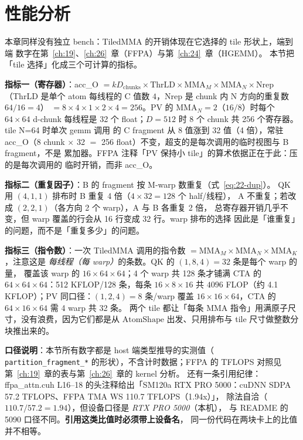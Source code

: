 \section{性能分析}

本章同样没有独立 bench：TiledMMA 的开销体现在它选择的 tile 形状上，端到端
数字在第~\ref{ch:19}、\ref{ch:26}~章（FFPA）与第~\ref{ch:24}~章（HGEMM）。
本节把「tile 选择」化成三个可计算的指标。

\textbf{指标一（寄存器）}：acc\_O $=kD_{\mathrm{chunks}}\times\mathrm{ThrLD}
\times\mathrm{MMA}_M\times\mathrm{MMA}_N\times\mathrm{Nrep}$（ThrLD 是单个
atom 每线程的 C 值数 $4$，Nrep 是 chunk 内 N 方向的重复数 $64/16=4$）
$=8\times4\times1\times2\times4=256$。PV 的
$\mathrm{MMA}_N = 2$（$16/8$）时每个 $64\times64$ d-chunk 每线程是 32 个
float；$D=512$ 时 $8$ 个 chunk 共 256 个寄存器。tile N=64 时单次 gemm 调用
的 C fragment 从 8 值涨到 32 值（4 倍），常驻 acc\_O（8 chunk $\times$ 32
$=$ 256 float）不变，超支的是每次调用的临时视图与 B fragment，不是
累加器。FFPA 注释「PV 保持小 tile」的算术依据正在于此：压的是每次调用的
临时开销，而非 acc\_O。

\textbf{指标二（重复因子）}：B 的 fragment 按 M-warp 数重复（式~\eqref{eq:22-dup}）。
QK 用 $(4,1,1)$ 排布时 B 重复 4 倍（$4\times32=128$ 个 half/线程），
A 不重复；若改成 $(2,2,1)$（各方向 2 个 warp），A 与 B 各重复 2 倍，
总寄存器开销几乎不变，但 warp 覆盖的行会从 16 行变成 32 行。warp 排布的选择
因此是「谁重复」的问题，而不是「重复多少」的问题。

\textbf{指标三（指令数）}：一次 TiledMMA 调用的指令数
$=\mathrm{MMA}_M\times\mathrm{MMA}_N\times\mathrm{MMA}_K$，注意这是
\emph{每线程（每 warp）}的条数。QK 的 $(1,8,4)=32$ 条是每个 warp 的量，
覆盖该 warp 的 $16\times64\times64$；4 个 warp 共 128 条才铺满 CTA 的
$64\times64\times64$：512 KFLOP/128 条，每条 $16\times8\times16$ 共
$4096$ FLOP（约 4.1 KFLOP）；PV 同口径：$(1,2,4)=8$ 条/warp 覆盖
$16\times16\times64$，CTA 的 $64\times16\times64$ 需 4 warp 共 32 条。
两个 tile 都让「每条 MMA 指令」用满原子尺寸，没有浪费，因为它们都是从
$\mathrm{AtomShape}$ 出发、只用排布与 tile 尺寸做整数分块推出来的。

\textbf{口径说明}：本节所有数字都是 host 端类型推导的实测值（
\texttt{partition\_\allowbreak{}fragment\_\allowbreak{}*} 的形状），不含计时数据；FFPA 的
TFLOPS 对照见第~\ref{ch:19}~章的表与第~\ref{ch:26}~章的 kernel 分析。
还有一条引用纪律：ffpa\_attn.cuh L16--18 的头注释给出「SM120a
RTX PRO 5000：cuDNN SDPA 57.2 TFLOPS、FFPA TMA WS 110.7 TFLOPS（1.94x）」，
除法自洽（$110.7/57.2=1.94$），但设备口径是 \emph{RTX PRO 5000}（本机），
与 README 的 5090 口径不同。\textbf{引用这类比值时必须带上设备名}，
同一份代码在两块卡上的比值并不相等。

